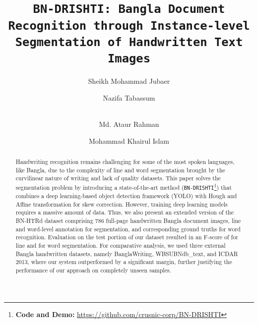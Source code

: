 \documentclass[runningheads]{llncs}
\begin{document}
\title{\texttt{BN-DRISHTI: Bangla Document Recognition through Instance-level Segmentation of Handwritten Text Images}}



\author{Sheikh Mohammad Jubaer \and
Nazifa Tabassum \and \\
Md. Ataur Rahman \and 
Mohammad Khairul Islam}


\maketitle         


\begin{abstract}
Handwriting recognition remains challenging for some of the most spoken languages, like Bangla, due to the complexity of line and word segmentation brought by the curvilinear nature of writing and lack of quality datasets. This paper solves the segmentation problem by introducing a state-of-the-art method (\texttt{BN-DRISHTI}\footnote{\textbf{Code and Demo:} \url{https://github.com/crusnic-corp/BN-DRISHTI}}) that combines a deep learning-based object detection framework (YOLO) with Hough and Affine transformation for skew correction. However, training deep learning models requires a massive amount of data. Thus, we also present an extended version of the BN-HTRd dataset comprising 786 full-page handwritten Bangla document images, line and word-level annotation for segmentation, and corresponding ground truths for word recognition. Evaluation on the test portion of our dataset resulted in an F-score of  for line and  for word segmentation. For comparative analysis, we used three external Bangla handwritten datasets, namely BanglaWriting, WBSUBNdb\_text, and ICDAR 2013, where our system outperformed by a significant margin, further justifying the performance of our approach on completely unseen samples.



\end{abstract}
\end{document}
